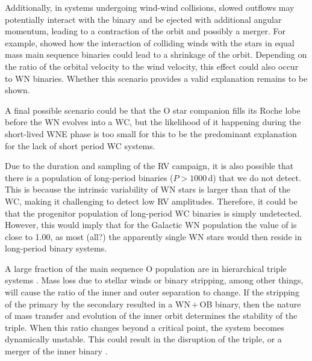 Additionally, in systems undergoing wind-wind collisions, slowed outflows may potentially interact with the binary and be ejected with additional angular momentum, leading to a contraction of the orbit and possibly a merger. For example, \citet{macleod_pre-common-envelope_2020} showed how the interaction of colliding winds with the stars in equal mass main sequence binaries could lead to a shrinkage of the orbit. Depending on the ratio of the orbital velocity to the wind velocity, this effect could also occur to WN binaries. Whether this scenario provides a valid explanation remains to be shown.

A final possible scenario could be that the O star companion fills its Roche lobe before the WN evolves into a WC, but the likelihood of it happening during the short-lived WNE phase is too small for this to be the predominant explanation for the lack of short period WC systems.

Due to the duration and sampling of the RV campaign, it is also possible that there is a population of long-period binaries ($P>1000\,$d) that we do not detect. This is because the intrinsic variability of WN stars is larger than that of the WC, making it challenging to detect low RV amplitudes. Therefore, it could be that the progenitor population of long-period WC binaries is simply undetected. However, this would imply that for the Galactic WN population the value of \fintWN{} is close to 1.00, as most (all?) the apparently single WN stars would then reside in long-period binary systems.


A large fraction of the main sequence O population are in hierarchical triple systems \citep[e.g.,][]{sana_southern_2014,moe_mind_2017}. Mass loss due to stellar winds or binary stripping, among other things, will cause the ratio of the inner and outer separation to change. If the stripping of the primary by the secondary resulted in a WN\,$+$\,OB binary, then the nature of mass transfer and evolution of the inner orbit determines the stability of the triple. When this ratio changes beyond a critical point, the system becomes dynamically unstable. This could result in the disruption of the triple, or a merger of the inner binary \citep{toonen_evolution_2020}.


